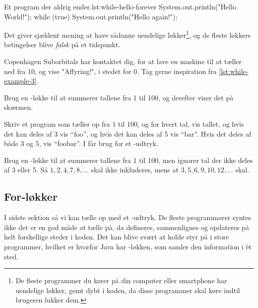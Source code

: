 		\begin{JavaCode}{Et program der aldrig ender.}{lst:while-hello-forever}
			System.out.println("Hello World!");
			while (true) {
				System.out.println("Hello again!");
			}
		\end{JavaCode}

        Det giver sjældent mening at have sådanne uendelige
        løkker\footnote{De fleste programmer du kører på din computer
        eller smartphone har uendelige løkker, gemt dybt i koden, da
        disse programmer skal køre indtil brugeren lukker dem.}, og de
        fleste løkkers betingelser blive \emph{falsk} på et
        tidspunkt.

		\begin{exercise}
			Copenhagen Suborbitals har kontaktet dig, for at lave en maskine til
            at tæller ned fra 10, og vise "Affyring!", i stedet for 0.
            Tag gerne inspiration fra
            \autoref{lst:while-example-3}.
		\end{exercise}

		\begin{exercise}
            Brug en -løkke til at summerer tallene
            fra 1 til 100, og derefter viser det på skærmen.
		\end{exercise}

		\begin{exercise}
            Skriv et program som tæller op fra \(1\) til \(100\), og
            for hvert tal, vis tallet, og hvis det kan deles af 3 vis
            ``foo'', og hvis det kan deles af 5 vis ``bar''. Hvis det
            deles af både 3 og 5, vis ``foobar''.  I får brug for et
            -udtryk.
        \end{exercise}

		\begin{exercise}
            Brug en -løkke til at summerer tallene
            fra 1 til 100, men ignorer tal der ikke deles af 3 eller
            5. Så \(1, 2, 4, 7, 8, \dots\) skal ikke inkluderes, mens
            at \(3, 5, 6, 9, 10, 12, \dots\) skal.
        \end{exercise}

	\subsection{For-løkker}

		I sidste sektion så vi kan tælle op med et -udtryk.
        De fleste programmører syntes ikke det er en god måde at tælle
        på, da  defineres, sammenlignes og opdateres på
        helt forskellige steder i koden.  Det kan blive svært at holde
        styr på i store programmer, hvilket er hvorfor Java har
        -løkken, som samler den information i
		èt sted.

